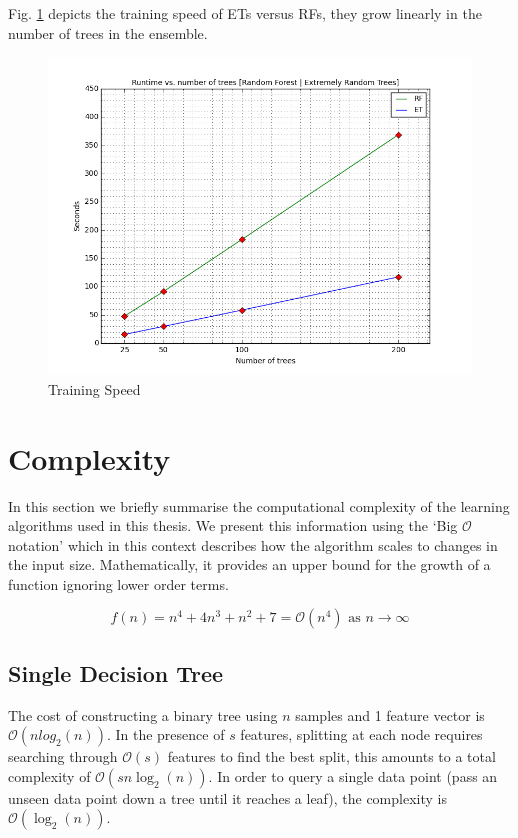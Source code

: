 Fig. \ref{runtime} depicts the training speed of ETs versus RFs, they grow linearly in the number of trees in the ensemble.  

\begin{figure}
\includegraphics[width=\textwidth]{images/Runtime_evolution_RF_ET.png}
\caption{Training Speed}
\label{runtime}
\end{figure} 

\section{Complexity}

In this section we briefly summarise the computational complexity of the learning algorithms used in this thesis. We present this information using the `Big $\mathcal{O}$ notation' which in this context describes how the algorithm scales to changes in the input size. Mathematically, it provides an upper bound for the growth of a function ignoring lower order terms. 

\begin{equation}
f(n) = n^{4} + 4n^{3} + n^{2} + 7 = \mathcal{O}(n^{4}) \textrm{ as } n \rightarrow \infty 
\end{equation}

\subsection{Single Decision Tree}

The cost of constructing a binary tree using $n$ samples and 1 feature vector is $\mathcal{O}(nlog_{2}(n))$. In the presence of $s$ features, splitting at each node requires searching through $\mathcal{O}(s)$ features to find the best split, this amounts to a total complexity of $\mathcal{O}(sn\log_{2}(n))$. In order to query a single data point (pass an unseen data point down a tree until it reaches a leaf), the complexity is $\mathcal{O}(\log_{2}(n))$. 

